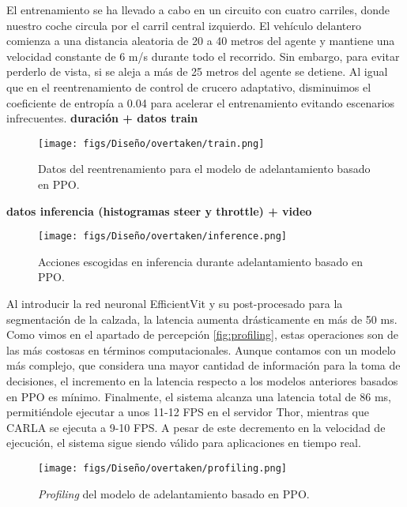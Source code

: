 El entrenamiento se ha llevado a cabo en un circuito con cuatro carriles, donde nuestro coche circula por el carril central izquierdo. El vehículo delantero comienza a una distancia aleatoria de 20 a 40 metros del agente y mantiene una velocidad constante de 6 m/s durante todo el recorrido. Sin embargo, para evitar perderlo de vista, si se aleja a más de 25 metros del agente se detiene. Al igual que en el reentrenamiento de control de crucero adaptativo, disminuimos el coeficiente de entropía a 0.04 para acelerar el entrenamiento evitando escenarios infrecuentes. \textbf{duración + datos train}
\begin{figure}[ht]
\centering
\texttt{[image: figs/Diseño/overtaken/train.png]}
\caption{Datos del reentrenamiento para el modelo de adelantamiento basado en \ac{PPO}.}
\label{fig:train_overtaken}
\end{figure}

\textbf{datos inferencia (histogramas steer y throttle) + video}
\begin{figure}[ht]
\centering
\texttt{[image: figs/Diseño/overtaken/inference.png]}
\caption{Acciones escogidas en inferencia durante adelantamiento basado en \ac{PPO}.}
\label{fig:inference_overtaken}
\end{figure}

Al introducir la red neuronal EfficientVit y su post-procesado para la segmentación de la calzada, la latencia aumenta drásticamente en más de 50 ms. Como vimos en el apartado de percepción \ref{fig:profiling}, estas operaciones son de las más costosas en términos computacionales. Aunque contamos con un modelo más complejo, que considera una mayor cantidad de información para la toma de decisiones, el incremento en la latencia respecto a los modelos anteriores basados en \ac{PPO} es mínimo. Finalmente, el sistema alcanza una latencia total de 86 ms, permitiéndole ejecutar a unos 11-12 \ac{FPS} en el servidor Thor, mientras que CARLA se ejecuta a 9-10 \ac{FPS}. A pesar de este decremento en la velocidad de ejecución, el sistema sigue siendo válido para aplicaciones en tiempo real.
\begin{figure}[ht]
\centering
\texttt{[image: figs/Diseño/overtaken/profiling.png]}
\caption{\textit{Profiling} del modelo de adelantamiento basado en \ac{PPO}.}
\label{fig:profiling_overtaken}
\end{figure}

